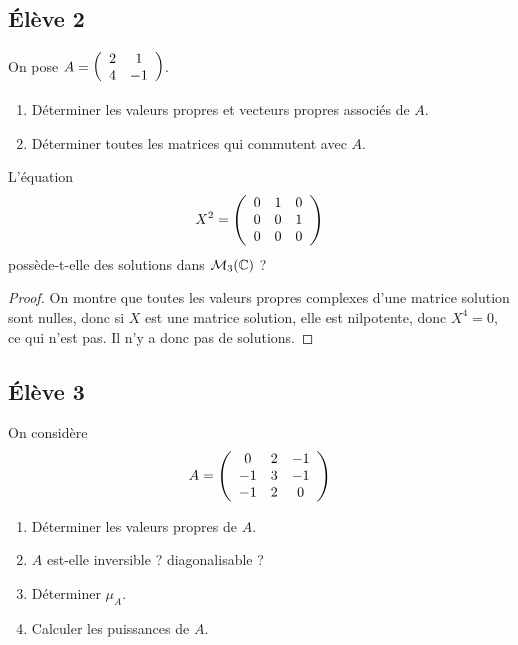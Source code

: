 \documentclass[10pt]{scrartcl}
\begin{document}
    \subsection*{Élève 2}
    \begin{ccp}
        On pose $A=\left(\begin{array}{c c} 2 & 1\\ 4 & -1\end{array}\right)$.
        \begin{enumerate}
            \item Déterminer les valeurs propres et vecteurs propres associés de $A$.
            \item Déterminer toutes les matrices qui commutent avec $A$.
        \end{enumerate}
    \end{ccp}

    \begin{exo}
        L'équation 
        \[
            X^2=\left(\begin{array}{c c c} 0 & 1 & 0\\ 0 & 0 & 1\\ 0 & 0 & 0\end{array}\right)
        \]
        possède-t-elle des solutions dans $\mathcal M_3(\operatorname{\mathbb C})$ ? 
    \end{exo}

    \begin{proof}
        On montre que toutes les valeurs propres complexes d'une matrice solution
        sont nulles, donc si $X$ est une matrice solution, elle est nilpotente, donc 
        $X^4=0$, ce qui n'est pas. 
        Il n'y a donc pas de solutions.
    \end{proof}

    \subsection*{Élève 3}
    \begin{ccp}
        On considère 
        \[
            A=\left(\begin{array}{c c c}
                0 & 2 & -1\\
                -1 & 3 & -1\\
                -1 & 2 & 0
            \end{array}\right)
        \]
        \begin{enumerate}
            \item Déterminer les valeurs propres de $A$. 
            \item $A$ est-elle inversible ? diagonalisable ?
            \item Déterminer $\mu_A$.
            \item Calculer les puissances de $A$.
        \end{enumerate}
    \end{ccp}
\end{document}
